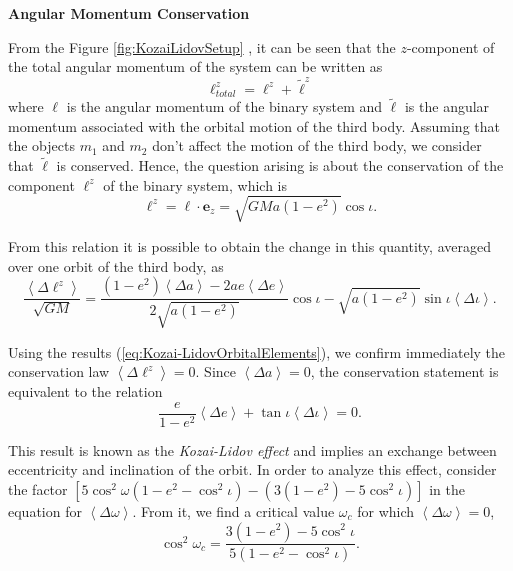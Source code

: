 \textbf{Angular Momentum Conservation}

From the Figure \ref{fig:KozaiLidovSetup} , it can be seen that the $z$-component of the total angular momentum of the system can be written as
\begin{equation}
\boldsymbol{\ell} ^z_{total} = \boldsymbol{\ell}^z + \tilde{\boldsymbol{\ell}}^z
\end{equation}
where $\boldsymbol{\ell}$ is the angular momentum of the binary system and $\tilde{\boldsymbol{\ell}}$ is the angular momentum associated with the orbital motion of the third body. Assuming that the objects $m_1$ and $m_2$ don't affect the motion of the third body, we consider that $\tilde{\boldsymbol{\ell}}$ is conserved. Hence, the question arising is about the conservation of the component $\boldsymbol{\ell}^z$ of the binary system, which is
\begin{equation}
\ell^z = \boldsymbol{\ell} \cdot \textbf{e}_z = \sqrt{GMa(1-e^2)} \cos \iota.
\end{equation}

From this relation it is possible to obtain the change in this quantity, averaged over one orbit of the third body, as
\begin{equation}
\frac{\left\langle \Delta \ell^z \right\rangle }{\sqrt{GM}}= \frac{(1-e^2)\left\langle \Delta a \right\rangle - 2ae \left\langle \Delta e \right\rangle}{2 \sqrt{a(1-e^2)} }\cos \iota - \sqrt{a(1-e^2)} \sin \iota  \left\langle \Delta \iota \right\rangle .
\end{equation}

Using the results (\ref{eq:Kozai-LidovOrbitalElements}), we confirm immediately the conservation law $\left\langle \Delta \ell^z \right\rangle=0$. Since $\left\langle \Delta a \right\rangle=0$, the conservation statement is equivalent to the relation
\begin{equation}
\frac{e}{1-e^2} \left\langle \Delta e \right\rangle + \tan \iota \left\langle \Delta \iota \right\rangle = 0.
\end{equation}

This result is known as the \textit{Kozai-Lidov effect} and implies an exchange between eccentricity and inclination of the orbit. In order to analyze this effect, consider the factor $\left[  5\cos^2 \omega (1-e^2-\cos^2 \iota)- (3(1-e^2) - 5\cos^2 \iota ) \right]$ in the equation for $\left\langle \Delta \omega \right\rangle$. From it, we find a critical value $\omega_c$ for which $\left\langle \Delta \omega \right\rangle= 0$,
\begin{equation}
\cos^2 \omega_c = \frac{3(1-e^2) - 5\cos^2 \iota }{5 (1-e^2-\cos^2 \iota)}.
\end{equation}

